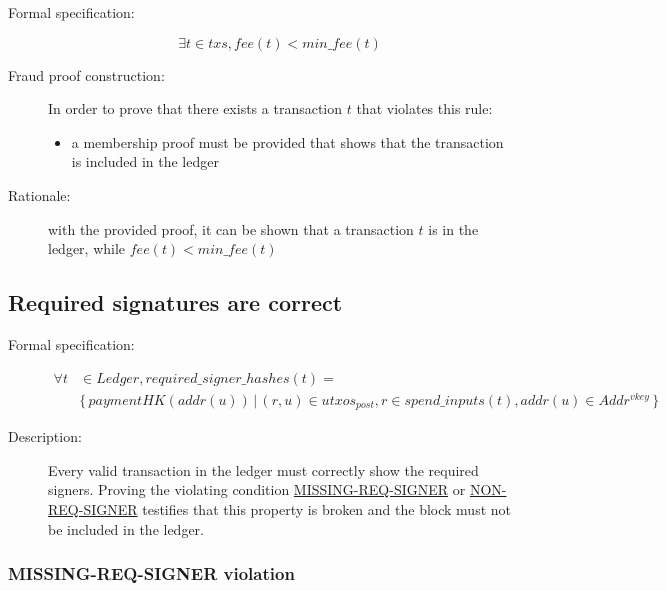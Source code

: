 \documentclass[../midgard.tex]{subfiles}
\begin{document}
\begin{description}

\item[Formal specification:]
\begin{equation*}
    \exists t \in txs, fee(t) < min\_fee(t)
\end{equation*}

\item[Fraud proof construction:] In order to prove that there exists a transaction $t$ that violates this rule:
\begin{itemize}
    \item a membership proof must be provided that shows that the transaction is included in the ledger
\end{itemize}

\item[Rationale:] with the provided proof, it can be shown that a transaction $t$ is in the ledger, while $fee(t) < min\_fee(t)$

\end{description}

\subsection{Required signatures are correct}
\label{rule:required-signatures-are-correct}

\begin{description}

\item[Formal specification:]
\begin{equation*}
\begin{split}
    \forall t & \in Ledger, required\_signer\_hashes(t) = \\
    & \{ \, paymentHK(addr(u)) \, | \, (r, u) \in utxos_{post}, r \in spend\_inputs(t), addr(u) \in Addr^{vkey} \, \}
\end{split}
\end{equation*}
    
\item[Description:] Every valid transaction in the ledger must correctly show the required signers.
  Proving the violating condition \hyperref[violation:MISSING-REQ-SIGNER]{MISSING-REQ-SIGNER} or \hyperref[violation:NON-REQ-SIGNER]{NON-REQ-SIGNER} testifies that this property is broken and the block must not be included in the ledger.
    
\end{description}

\subsubsection{MISSING-REQ-SIGNER violation}
\label{violation:MISSING-REQ-SIGNER}
\end{document}
